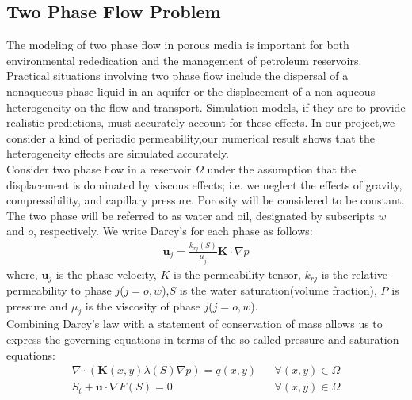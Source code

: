 \documentclass[12pt]{article}
\begin{document}
\subsection{Two Phase Flow Problem }
The modeling of two phase flow in porous media is important for both
environmental rededication and the management of petroleum
reservoirs. Practical situations involving two phase flow include
the dispersal of a nonaqueous phase liquid in an aquifer or the
displacement of a non-aqueous heterogeneity on the flow and
transport. Simulation models, if they are to provide realistic
predictions, must accurately account for these effects.
In our project,we consider a kind of periodic permeability,our
numerical result shows that the heterogeneity effects are simulated accurately.\\
Consider two phase flow in a reservoir $\Omega$ under the assumption
that the displacement is dominated by viscous effects; i.e. we
neglect the effects of gravity, compressibility, and capillary
pressure. Porosity will be considered to be constant. The two phase
will be referred to as water and oil, designated by subscripts $w$
and $o$, respectively. We write Darcy's for each phase as follows:
\begin{eqnarray}
\mathbf{u}_{j} = \frac{k_{rj}(S)}{\mu_{j}} \mathbf{K} \cdot \nabla p
\end{eqnarray}
\indent where, $\mathbf{u}_{j}$ is the phase velocity, $K$ is the
permeability tensor, $k_{rj}$ is the relative permeability to phase
$j$($j=o,w$),$S$ is the water saturation(volume fraction), $P$ is
pressure and $\mu_{j}$ is the viscosity of phase $j$($j=o,w$).\\
Combining Darcy's law with a statement of conservation of mass
allows us to express the governing equations in terms of the
so-called pressure and saturation equations:
\begin{eqnarray}
\nabla \cdot (\mathbf{K}(x,y)\lambda(S) \nabla p)= q(x,y) && \forall(x,y)\in\Omega\\
 S_{t} + \mathbf{u} \cdot \nabla F(S) = 0&& \forall(x,y)\in\Omega
\end {eqnarray}
\end{document}
